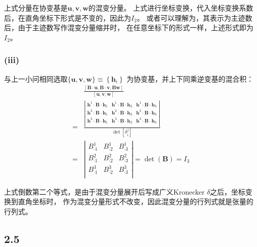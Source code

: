 \documentclass[UTF8,zihao=5]{ctexart}
\newcommand{\bm}[1]{{\mathbf{#1}}}
\begin{document}
上式分量在协变基是$\bm{u},\bm{v},\bm{w}$的混变分量。
上式进行坐标变换，代入坐标变换系数后，在直角坐标下形式是不变的，因此为$I_2$。
或者可以理解为，其表示为主迹数后，由于主迹数写作混变分量缩并时，
在任意坐标下的形式一样，上述形式即为
$I_2$。

\subsubsection*{(iii)}

与上一小问相同选取$\{\bm{u},\bm{v},\bm{w}\}\equiv\left\{\bm{h}_i\right\}$
为协变基，并上下同乘逆变基的混合积：
\begin{equation}
    \begin{aligned}
          & \frac{
            [\bm{B}\cdot\bm{u}, \bm{B}\cdot\bm{v}, \bm{B}\bm{w}]}
        {[\bm{u}, \bm{v}, \bm{w}]}
        \\
        = &
        \frac{
            \left|
            \begin{matrix}
                \bm{h}^1\cdot\bm{B}\cdot\bm{h}_1 & \bm{h}^1\cdot\bm{B}\cdot\bm{h}_2 & \bm{h}^1\cdot\bm{B}\cdot\bm{h}_3 \\
                \bm{h}^2\cdot\bm{B}\cdot\bm{h}_1 & \bm{h}^2\cdot\bm{B}\cdot\bm{h}_2 & \bm{h}^2\cdot\bm{B}\cdot\bm{h}_3 \\
                \bm{h}^3\cdot\bm{B}\cdot\bm{h}_1 & \bm{h}^3\cdot\bm{B}\cdot\bm{h}_2 & \bm{h}^3\cdot\bm{B}\cdot\bm{h}_3 \\
            \end{matrix}
            \right|
        }{\det{[\delta_i^j]}} \\
        = &
        \left|
        \begin{matrix}
            B^1_{\cdot1} & B^1_{\cdot2} & B^1_{\cdot3} \\
            B^2_{\cdot1} & B^2_{\cdot2} & B^2_{\cdot3} \\
            B^3_{\cdot1} & B^3_{\cdot2} & B^3_{\cdot3} \\
        \end{matrix}
        \right| = \det{(\bm{B})}=I_3
    \end{aligned}
\end{equation}

上式倒数第二个等式，是由于混变分量展开后写成广义Kronecker $\delta$之后，坐标变换到直角坐标时，
作为混变分量形式不改变，因此混变分量的行列式就是张量的行列式。

\subsection*{2.5}
\end{document}
